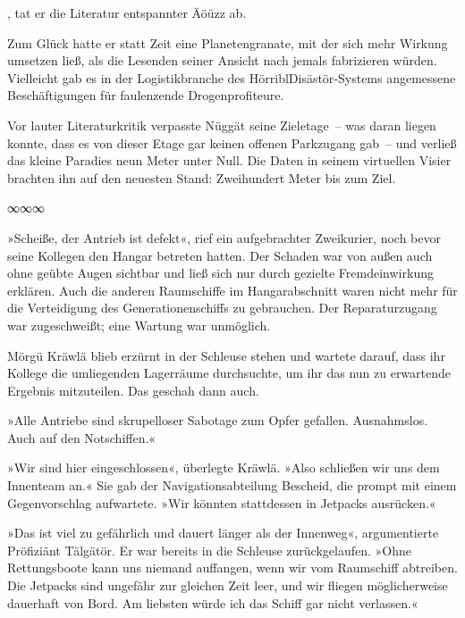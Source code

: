 , tat er die Literatur entspannter Äöüzz ab. 

Zum Glück hatte er statt Zeit eine Planetengranate, mit der sich mehr Wirkung umsetzen ließ, als die Lesenden seiner Ansicht nach jemals fabrizieren würden. Vielleicht gab es in der Logistikbranche des HörriblDisästör-Systems angemessene Beschäftigungen für faulenzende Drogenprofiteure.

Vor lauter Literaturkritik verpasste Nüggät seine Zieletage~– was daran liegen konnte, dass es von dieser Etage gar keinen offenen Parkzugang gab~– und verließ das kleine Paradies neun Meter unter Null. Die Daten in seinem virtuellen Visier brachten ihn auf den neuesten Stand: Zweihundert Meter bis zum Ziel.

\begin{center}
∞∞∞
\end{center}

»Scheiße, der Antrieb ist defekt«, rief ein aufgebrachter Zweikurier, noch bevor seine Kollegen den Hangar betreten hatten. Der Schaden war von außen auch ohne geübte Augen sichtbar und ließ sich nur durch gezielte Fremdeinwirkung erklären. Auch die anderen Raumschiffe im Hangarabschnitt waren nicht mehr für die Verteidigung des Generationenschiffs zu gebrauchen. Der Reparaturzugang war zugeschweißt; eine Wartung war unmöglich.

Mörgü Kräwlä blieb erzürnt in der Schleuse stehen und wartete darauf, dass ihr Kollege die umliegenden Lagerräume durchsuchte, um ihr das nun zu erwartende Ergebnis mitzuteilen. Das geschah dann auch.

»Alle Antriebe sind skrupelloser Sabotage zum Opfer gefallen. Ausnahmslos. Auch auf den Notschiffen.«

»Wir sind hier eingeschlossen«, überlegte Kräwlä. »Also schließen wir uns dem Innenteam an.« Sie gab der Navigationsabteilung Bescheid, die prompt mit einem Gegenvorschlag aufwartete. »Wir könnten stattdessen in Jetpacks ausrücken.«

»Das ist viel zu gefährlich und dauert länger als der Innenweg«, argumentierte Pröfiziänt Tälgätör. Er war bereits in die Schleuse zurückgelaufen. »Ohne Rettungsboote kann uns niemand auffangen, wenn wir vom Raumschiff abtreiben. Die Jetpacks sind ungefähr zur gleichen Zeit leer, und wir fliegen möglicherweise dauerhaft von Bord. Am liebsten würde ich das Schiff gar nicht verlassen.«

